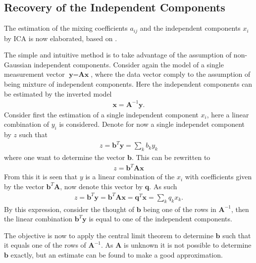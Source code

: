 \subsection{Recovery of the Independent Components}\label{sec:est_ica}
The estimation of the mixing coefficients $a_{ij}$ and the independent components $x_i$ by ICA is now elaborated, based on \cite[p. 166]{ICA}.  

The simple and intuitive method is to take advantage of the assumption of non-Gaussian independent components. 
Consider again the model of a single measurement vector $\textbf{y}=\textbf{Ax}$, where the data vector comply to the assumption of being mixture of independent components. Here the independent components can be estimated by the inverted model
\begin{align*}
\textbf{x}=\textbf{A}^{-1}\textbf{y}.
\end{align*}
Consider first the estimation of a single independent component $x_i$, here a linear combination of $y_i$ is considered. Denote for now a single independet component by $z$ such that
\begin{align}
z = \textbf{b}^T \textbf{y} = \sum_k b_k y_k \label{eq:ICA_comp}
\end{align} 
where one want to determine the vector $\textbf{b}$. This can be rewritten to 
\begin{align*}
z = \textbf{b}^T \textbf{Ax}
\end{align*} 
From this it is seen that $y$ is a linear combination of the $x_i$ with coefficients given by the vector $\textbf{b}^T \textbf{A}$, now denote this vector by $\textbf{q}$. As such  
\begin{align}
z = \textbf{b}^T \textbf{y}= \textbf{b}^T \textbf{Ax} = \textbf{q}^T \textbf{x} = \sum_k q_k x_k. \label{eq:ICA_comp2} 
\end{align}
By this expression, consider the thought of $\textbf{b}$ being one of the rows in $\textbf{A}^{-1}$, then the linear combination $\textbf{b}^{T}\textbf{y}$ is equal to one of the independent components. 
 
The objective is now to apply the central limit theorem to determine $\textbf{b}$ such that it equals one of the rows of $\textbf{A}^{-1}$. 
As $\textbf{A}$ is unknown it is not possible to determine $\textbf{b}$ exactly, but an estimate can be found to make a good approximation.

